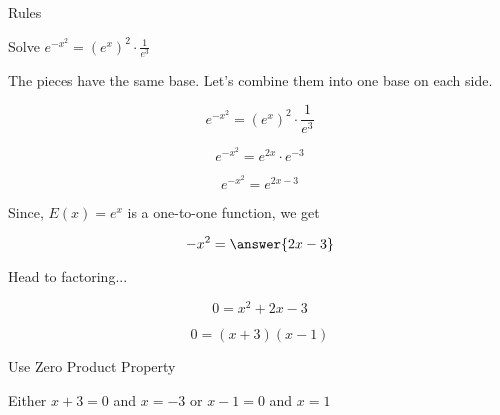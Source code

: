 \documentclass{ximera}
\begin{document}
\begin{example} Rules



Solve $e^{- x^2} = \left(e^x\right)^2 \cdot \frac{1}{e^3}$


\begin{explanation} 

The pieces have the same base.  Let's combine them into one base on each side.



\[  e^{- x^2} = \left(e^x\right)^2 \cdot \frac{1}{e^3}     \]

\[  e^{- x^2}  = e^{2x} \cdot e^{-3} \]

\[  e^{- x^2}  = e^{2x-3}  \]



Since, $E(x) = e^x$ is a one-to-one function, we get


\[  -x^2 = \answer{2x - 3}  \]


Head to factoring...


\[  0 = x^2 + 2x - 3  \]


\[  0 =(x+3)(x-1) \]


Use Zero Product Property



Either  $x+3 = 0$ and $x = -3$  or $x-1=0$ and $x = 1$


\end{explanation}
\end{example}
\end{document}
